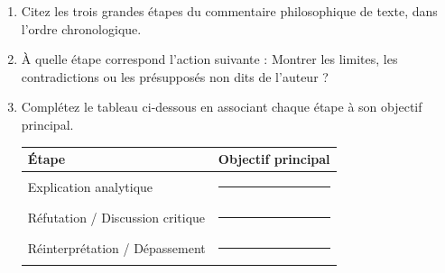 \documentclass[11pt]{article}
\begin{document}
\begin{exercice}
\begin{enumerate}
    \item Citez les trois grandes étapes du commentaire philosophique de texte, dans l'ordre chronologique.
    \item À quelle étape correspond l'action suivante : \og Montrer les limites, les contradictions ou les présupposés non dits de l'auteur \fg ?
    \item Complétez le tableau ci-dessous en associant chaque étape à son objectif principal.
    \begin{tabular}{|l|p{8cm}|}
    \hline
    \textbf{Étape} & \textbf{Objectif principal} \\ \hline
    Explication analytique & \rule{8cm}{0.4pt} \\ \hline
    Réfutation / Discussion critique & \rule{8cm}{0.4pt} \\ \hline
    Réinterprétation / Dépassement & \rule{8cm}{0.4pt} \\ \hline
    \end{tabular}
\end{enumerate}
\end{exercice}
\end{document}
